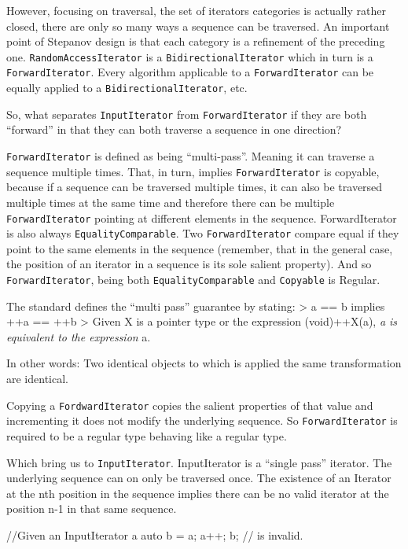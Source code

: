\documentclass{wg21}
\begin{document}
However, focusing on traversal, the set of iterators categories is
actually rather closed, there are only so many ways a sequence can be
traversed. An important point of Stepanov design is that each category
is a refinement of the preceding one. \texttt{RandomAccessIterator} is a
\texttt{BidirectionalIterator} which in turn is a
\texttt{ForwardIterator}. Every algorithm applicable to a
\texttt{ForwardIterator} can be equally applied to a
\texttt{BidirectionalIterator}, etc.

So, what separates \texttt{InputIterator} from \texttt{ForwardIterator}
if they are both ``forward'' in that they can both traverse a sequence
in one direction?

\texttt{ForwardIterator} is defined as being ``multi-pass''. Meaning it
can traverse a sequence multiple times. That, in turn, implies
\texttt{ForwardIterator} is copyable, because if a sequence can be
traversed multiple times, it can also be traversed multiple times at the
same time and therefore there can be multiple \texttt{ForwardIterator}
pointing at different elements in the sequence. ForwardIterator is also
always \texttt{EqualityComparable}. Two \texttt{ForwardIterator} compare
equal if they point to the same elements in the sequence (remember, that
in the general case, the position of an iterator in a sequence is its
sole salient property). And so \texttt{ForwardIterator}, being both
\texttt{EqualityComparable} and \texttt{Copyable} is Regular.

The standard defines the ``multi pass'' guarantee by stating:
\textgreater{} a == b implies ++a == ++b \textgreater{} Given X is a
pointer type or the expression (void)++X(a), \emph{a is equivalent to
	the expression }a.

In other words: Two identical objects to which is applied the same
transformation are identical. 

Copying a \texttt{FordwardIterator} copies
the salient properties of that value and incrementing it does not modify
the underlying sequence. So \texttt{ForwardIterator} is required to be a
regular type behaving like a regular type.

Which bring us to \texttt{InputIterator}. InputIterator is a ``single
pass'' iterator. The underlying sequence can on only be traversed once.
The existence of an Iterator at the nth position in the sequence implies
there can be no valid iterator at the position n-1 in that same
sequence.

\begin{codeblock}
//Given an InputIterator a 
auto b = a; a++;
b; // is invalid.
\end{codeblock}
\end{document}
